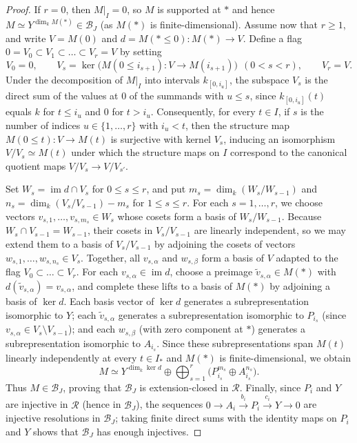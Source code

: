 \documentclass[a4paper,reqno,10pt]{amsart}
\numberwithin{equation}{section}
\theoremstyle{definition}
\newcommand{\B}{\mathcal B}
\newcommand{\Rcat}{\mathcal R}
\DeclareMathOperator{\im}{im}
\begin{document}
\begin{proof}
If $r=0$, then $M|_I=0$, so $M$ is supported at $*$ and hence
$M\simeq Y^{\dim_k M(*)}\in\B_J$ (as $M(*)$ is finite-dimensional). Assume now
that $r\ge 1$, and write $V=M(0)$ and $d=M(*\le 0):M(*)\to V$. Define a flag
$0=V_0\subset V_1\subset\dots\subset V_r=V$ by setting
\[
  V_0=0,\qquad V_s=\ker\bigl(M(0\le i_{s+1}):V\to M(i_{s+1})\bigr)\ \ (0<s<r),\qquad V_r=V.
\]
Under the decomposition of $M|_I$ into intervals $k_{[0,i_u]}$, the subspace
$V_s$ is the direct sum of the values at $0$ of the summands with $u\le s$,
since $k_{[0,i_u]}(t)$ equals $k$ for $t\le i_u$ and $0$ for $t>i_u$.
Consequently, for every $t\in I$, if $s$ is the number of indices
$u\in\{1,\dots,r\}$ with $i_u<t$, then the structure map $M(0\le t):V\to M(t)$
is surjective with kernel $V_s$, inducing an isomorphism $V/V_s\simeq M(t)$ under
which the structure maps on $I$ correspond to the canonical quotient maps
$V/V_s\to V/V_{s'}$.

Set $W_s=\im d\cap V_s$ for $0\le s\le r$, and put
$m_s=\dim_k(W_s/W_{s-1})$ and $n_s=\dim_k(V_s/V_{s-1})-m_s$ for $1\le s\le r$.
For each $s=1,\dots,r$, we choose vectors $v_{s,1},\dots,v_{s,m_s}\in W_s$
whose cosets form a basis of $W_s/W_{s-1}$. Because
$W_s\cap V_{s-1}=W_{s-1}$, their cosets in $V_s/V_{s-1}$ are linearly
independent, so we may extend them to a basis of $V_s/V_{s-1}$ by adjoining
the cosets of vectors $w_{s,1},\dots,w_{s,n_s}\in V_s$. Together, all
$v_{s,\alpha}$ and $w_{s,\beta}$ form a basis of $V$ adapted to the flag
$V_0\subset\dots\subset V_r$. For each $v_{s,\alpha}\in\im d$, choose a
preimage $\tilde v_{s,\alpha}\in M(*)$ with $d(\tilde v_{s,\alpha})=v_{s,\alpha}$,
and complete these lifts to a basis of $M(*)$ by adjoining a basis of $\ker d$.
Each basis vector of $\ker d$ generates a subrepresentation isomorphic to $Y$;
each $\tilde v_{s,\alpha}$ generates a subrepresentation isomorphic to
$P_{i_s}$ (since $v_{s,\alpha}\in V_s\setminus V_{s-1}$); and each
$w_{s,\beta}$ (with zero component at $*$) generates a subrepresentation
isomorphic to $A_{i_s}$. Since these subrepresentations span $M(t)$ linearly
independently at every $t\in I_*$ and $M(*)$ is finite-dimensional, we obtain
\[
 M\simeq Y^{\dim_k\ker d}\oplus
 \bigoplus_{s=1}^r\bigl(P_{i_s}^{m_s}\oplus A_{i_s}^{n_s}\bigr).
\]
Thus $M\in\B_J$, proving that $\B_J$ is extension-closed in $\Rcat$. Finally,
since $P_i$ and $Y$ are injective in $\Rcat$ (hence in $\B_J$), the sequences
$0\to A_i\xrightarrow{b_i}P_i\xrightarrow{c_i}Y\to0$ are injective resolutions in
$\B_J$; taking finite direct sums with the identity maps on $P_i$ and $Y$ shows
that $\B_J$ has enough injectives.
\end{proof}
\end{document}
